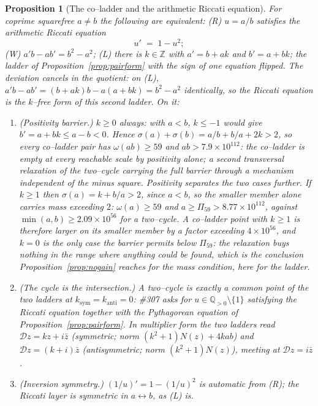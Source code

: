 \documentclass[11pt]{article}
\newtheorem{proposition}[theorem]{Proposition}
\theoremstyle{definition}
\begin{document}
\begin{proposition}[The co--ladder and the arithmetic Riccati equation]\label{prop:coladder}
For coprime squarefree $a\neq b$ the following are equivalent:
\textup{(R)} $u=a/b$ satisfies the arithmetic Riccati equation
\[ u'\;=\;1-u^2; \]
\textup{(W)} $a'b-ab'=b^2-a^2$; \textup{(L)} there is $k\in\mathbb{Z}$ with $a'=b+ak$ \emph{and}
$b'=a+bk$; the ladder of Proposition~\ref{prop:pairform} with the sign of one equation flipped.
The deviation cancels in the quotient: on \textup{(L)}, $a'b-ab'=(b+ak)b-a(a+bk)=b^2-a^2$
identically, so the Riccati equation is the $k$--free form of this \emph{second} ladder. On it:
\begin{enumerate}[label=\textup{(\roman*)},leftmargin=2.2em]
\item \emph{(Positivity barrier.)} $k\ge0$ always: with $a<b$, $k\le-1$ would give
$b'=a+bk\le a-b<0$. Hence $\sigma(a)+\sigma(b)=a/b+b/a+2k>2$, so every co--ladder pair has
$\omega(ab)\ge59$ and $ab>7.9\times10^{112}$: the co--ladder is empty at every reachable scale
\emph{by positivity alone}; a second transversal relaxation of the two--cycle carrying the full
barrier through a mechanism independent of the minus square. Positivity separates the two cases
further. If $k\ge1$ then $\sigma(a)=k+b/a>2$, since $a<b$, so the \emph{smaller} member alone
carries mass exceeding $2$: $\omega(a)\ge59$ and $a\ge\Pi_{59}>8.77\times10^{112}$, against
$\min(a,b)\ge2.09\times10^{56}$ for a two--cycle. A co--ladder point with $k\ge1$ is therefore
larger on its smaller member by a factor exceeding $4\times10^{56}$, and $k=0$ is the only case the
barrier permits below $\Pi_{59}$: the relaxation buys nothing in the range where anything could be
found, which is the conclusion Proposition~\ref{prop:nogain} reaches for the mass condition, here
for the ladder.
\item \emph{(The cycle is the intersection.)} A two--cycle is exactly a common point of the two
ladders at $k_{\mathrm{sym}}=k_{\mathrm{anti}}=0$: \#307 asks for $u\in\mathbb{Q}_{>0}\setminus\{1\}$
satisfying the Riccati equation together with the Pythagorean equation of
Proposition~\ref{prop:pairform}. In multiplier form the two ladders read
$\mathcal{D}z=kz+i\bar z$ (symmetric; norm $(k^2+1)N(z)+4kab$) and $\mathcal{D}z=(k+i)\bar z$
(antisymmetric; norm $(k^2+1)N(z)$), meeting at $\mathcal{D}z=i\bar z$.
\item \emph{(Inversion symmetry.)} $(1/u)'=1-(1/u)^2$ is automatic from \textup{(R)}; the
Riccati layer is symmetric in $a\leftrightarrow b$, as \textup{(L)} is.
\end{enumerate}
\end{proposition}
\end{document}
